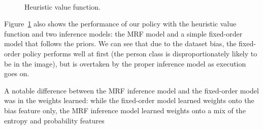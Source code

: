 \begin{figure}[h!]
\centering
{} \\
  \caption{Heuristic value function.}
  \label{fig:results_manual}
\end{figure}

Figure~\ref{fig:results_manual} also shows the performance of our policy with the heuristic value function and two inference models: the MRF model and a simple fixed-order model that follows the priors.
We can see that due to the dataset bias, the fixed-order policy performs well at first (the person class is disproportionately likely to be in the image), but is overtaken by the proper inference model as execution goes on.

A notable difference between the MRF inference model and the fixed-order model was in the weights learned: while the fixed-order model learned weights onto the bias feature only, the MRF inference model learned weights onto a mix of the entropy and probability features
